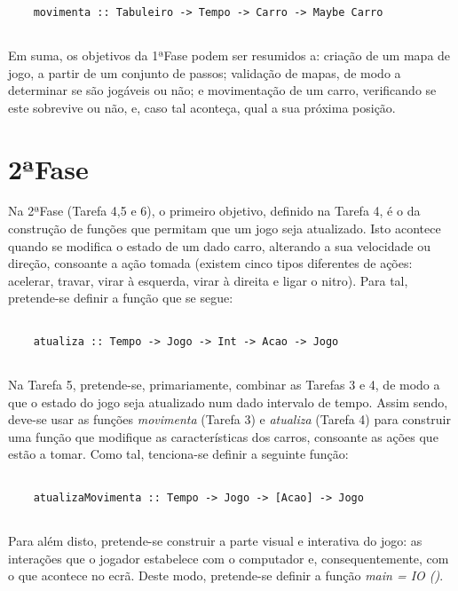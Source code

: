 \documentclass[a4paper]{report} %
\begin{document}
  \begin{verbatim}
    
    movimenta :: Tabuleiro -> Tempo -> Carro -> Maybe Carro
    
  \end{verbatim}

  \par \noindent Em suma, os objetivos da 1ªFase podem ser resumidos a: criação de um mapa de jogo, a partir de um conjunto de passos; validação de mapas, de modo a determinar se são jogáveis ou não; e movimentação de um carro, verificando se este sobrevive ou não, e, caso tal aconteça, qual a sua próxima posição.

  \section{2ªFase}
  \label{sec:analisefasee}

  Na 2ªFase (Tarefa 4,5 e 6), o primeiro objetivo, definido na Tarefa 4, é o da construção de funções que permitam que um jogo seja atualizado. Isto acontece quando se modifica o estado de um dado carro, alterando a sua velocidade ou direção, consoante a ação tomada (existem cinco tipos diferentes de ações: acelerar, travar, virar à esquerda, virar à direita e ligar o nitro). Para tal, pretende-se definir a função que se segue:

  \begin{verbatim}

    atualiza :: Tempo -> Jogo -> Int -> Acao -> Jogo
    
  \end{verbatim}

  \par \noindent Na Tarefa 5, pretende-se, primariamente, combinar as Tarefas 3 e 4, de modo a que o estado do jogo seja atualizado num dado intervalo de tempo. Assim sendo, deve-se usar as funções \textit{movimenta} (Tarefa 3) e \textit{atualiza} (Tarefa 4) para construir uma função que modifique as características dos carros, consoante as ações que estão a tomar. Como tal, tenciona-se definir a seguinte função:

  \begin{verbatim}

    atualizaMovimenta :: Tempo -> Jogo -> [Acao] -> Jogo
    
  \end{verbatim}
  
  \par \noindent Para além disto, pretende-se construir a parte visual e interativa do jogo: as interações que o jogador estabelece com o computador e, consequentemente, com o que acontece no ecrã. Deste modo, pretende-se definir a função \textit{main = IO ()}.
  
\end{document}
